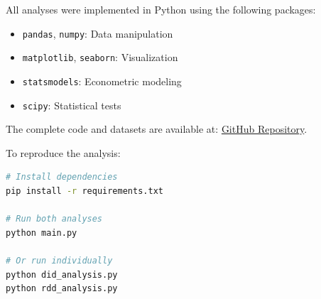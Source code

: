 \documentclass[a4paper,12pt,headsepline]{scrartcl} %
\begin{document}
All analyses were implemented in Python using the following packages:
\begin{itemize}
    \item \texttt{pandas}, \texttt{numpy}: Data manipulation
    \item \texttt{matplotlib}, \texttt{seaborn}: Visualization
    \item \texttt{statsmodels}: Econometric modeling
    \item \texttt{scipy}: Statistical tests
\end{itemize}

The complete code and datasets are available at: \href{https://github.com/introspective321/Sem_7_assignments}{\color{HyperlinkBlue}GitHub Repository}.

To reproduce the analysis:
\begin{lstlisting}[language=bash]
# Install dependencies
pip install -r requirements.txt

# Run both analyses
python main.py

# Or run individually
python did_analysis.py
python rdd_analysis.py
\end{lstlisting}
\end{document}
